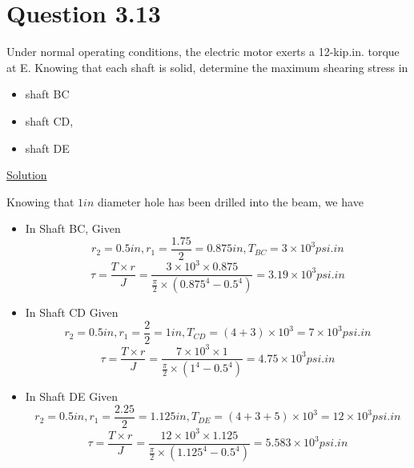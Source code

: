 \documentclass{article}
\begin{document}
\section*{Question 3.13}
 Under normal operating conditions, the electric motor exerts a 12-kip.in. torque at E. Knowing that each shaft is solid, determine the maximum shearing stress in
\begin{itemize}
 \item shaft BC
\item shaft CD,
\item shaft DE
\end{itemize}
\begin{center}\underline{Solution}\end{center}
Knowing that $1in$ diameter hole has been drilled into the beam, we have
\begin{itemize}
\item In Shaft BC,
Given\[r_{2} = 0.5in, r_{1}=\frac{1.75}{2} = 0.875in, T_{BC} = 3\times10^{3}psi.in\]
\[\tau = \frac{T\times r}{J} = \frac{3\times10^{3}\times0.875}{\frac{\pi}{2} \times (0.875^{4} - 0.5^{4})} = 3.19\times10^{3}psi.in\]
\item In Shaft CD\newline
Given\[r_{2} = 0.5in, r_{1}=\frac{2}{2} = 1in, T_{CD}=(4+3)\times10^{3} = 7\times10^{3}psi.in\]
\[\tau = \frac{T\times r}{J} = \frac{7\times10^{3}\times1}{\frac{\pi}{2} \times (1^{4} - 0.5^{4})} = 4.75\times10^{3}psi.in\]
\item In Shaft DE\newline
Given\[r_{2} = 0.5in, r_{1}=\frac{2.25}{2} = 1.125in, T_{DE}=(4+3+5)\times10^{3} = 12\times10^{3}psi.in\]
\[\tau = \frac{T\times r}{J} = \frac{12\times10^{3}\times1.125}{\frac{\pi}{2} \times (1.125^{4} - 0.5^{4})} = 5.583\times10^{3}psi.in\]
\end{itemize}


\end{document}
